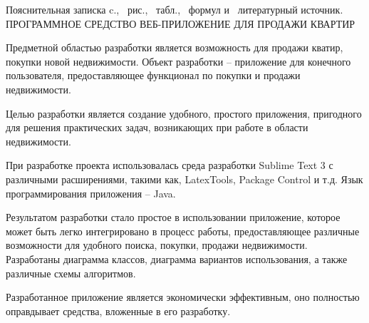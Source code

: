 \thispagestyle{empty}


\begin{center}
Пояснительная записка \pageref*{LastPage}c., \totfig{}~рис., \tottab{}~табл., \toteq{}~формул и \totref{}~литературный источник.\\
ПРОГРАММНОЕ СРЕДСТВО ВЕБ-ПРИЛОЖЕНИЕ ДЛЯ ПРОДАЖИ КВАРТИР
\end{center}

Предметной областью разработки является возможность для продажи кватир, покупки новой недвижимости. Объект разработки -- приложение для конечного пользователя, предоставляющее функционал по покупки и продажи недвижимости.

Целью разработки является создание удобного, простого приложения, пригодного для решения практических задач, возникающих при работе в области недвижимости.

При разработке проекта использовалась среда разработки Sublime Text 3 с различными расширениями, такими как, LatexTools, Package Control и т.д. Язык программирования приложения -- Java.


Результатом разработки стало простое в использовании приложение, которое может быть легко интегрировано в процесс работы, предоставляющее различные возможности для удобного поиска, покупки, продажи недвижимости. Разработаны диаграмма классов, диаграмма вариантов использования, а также различные схемы алгоритмов.

Разработанное приложение является экономически эффективным, оно полностью  оправдывает средства, вложенные в его разработку.





\clearpage
